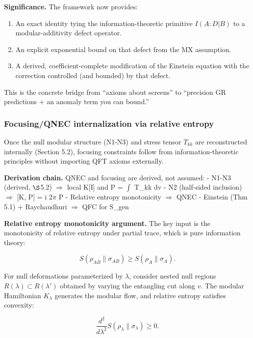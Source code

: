 \documentclass[11pt,a4paper]{article}
\theoremstyle{remark}
\providecommand{\tightlist}{%
  \setlength{\itemsep}{0pt}\setlength{\parskip}{0pt}}
\begin{document}
\textbf{Significance.} The framework now provides:

\begin{enumerate}
\def\labelenumi{\arabic{enumi}.}
\tightlist
\item
  An exact identity tying the information-theoretic primitive \(I(A:D|B)\) to a
  modular-additivity defect operator.
\item
  An explicit exponential bound on that defect from the MX assumption.
\item
  A derived, coefficient-complete modification of the Einstein equation with
  the correction controlled (and bounded) by that defect.
\end{enumerate}

This is the concrete bridge from ``axioms about screens'' to ``precision GR
predictions + an anomaly term you can bound.''

\subsubsection{Focusing/QNEC internalization via relative entropy}\label{focusingqnec-internalization-via-relative-entropy}

Once the null modular structure (N1-N3) and stress tensor \(T_{kk}\) are
reconstructed internally (Section 5.2), focusing constraints follow from
information-theoretic principles without importing QFT axioms externally.

\textbf{Derivation chain.} QNEC and focusing are derived, not assumed:
- N1-N3 (derived, \ensuremath{\S}5.2) \ensuremath{\Longrightarrow} local K{[}I{]} and P = \ensuremath{\int} T\_kk dv
- N2 (half-sided inclusion) \ensuremath{\Longrightarrow} {[}K, P{]} = i 2\ensuremath{\pi} P
- Relative entropy monotonicity \ensuremath{\Longrightarrow} QNEC
- Einstein (Thm 5.1) + Raychaudhuri \ensuremath{\Longrightarrow} QFC for S\_gen

\textbf{Relative entropy monotonicity argument.} The key input is the monotonicity
of relative entropy under partial trace, which is pure information theory:

\[
S(\rho_{AB} \| \sigma_{AB}) \ge S(\rho_A \| \sigma_A).
\]

For null deformations parameterized by \(\lambda\), consider nested null regions
\(R(\lambda) \subset R(\lambda')\) obtained by varying the entangling cut along
\(v\). The modular Hamiltonian \(K_\lambda\) generates the modular flow, and
relative entropy satisfies convexity:

\[
\frac{d^2}{d\lambda^2} S(\rho_\lambda \| \sigma_\lambda) \ge 0.
\]
\end{document}
